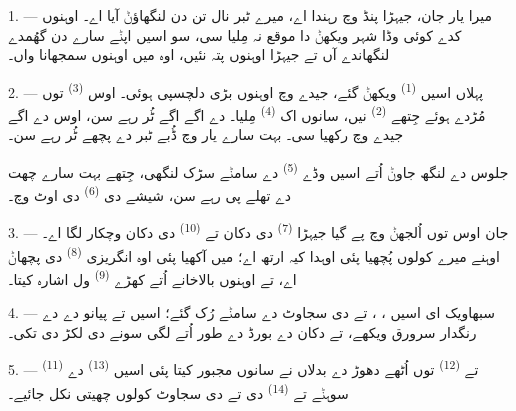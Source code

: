 
\VUsaut{4.0mm}
\VUsaut{3.0mm}

\VUsaut{3.0mm}

1. --- میرا یار جان، جیہڑا پنڈ وچ رہندا اے، میرے ٹبر نال تن دن لنگھاؤݨ آیا اے۔
 اوہنوں کدے کوئی وڈا شہر ویکھݨ دا موقع نہ مِلیا سی، سو اسیں اپݨے
سارے دن گھُمدے لنگھاندے آں تے جیہڑا اوہنوں پتہ نئیں، اوہ میں اوہنوں سمجھانا واں۔

2. --- پہلاں اسیں  \textsuperscript{(1)} ویکھݨ گئے، جیدے وچ اوہنوں
بڑی دلچسپی ہوئی۔ اوس  \textsuperscript{(3)} توں مُڑدے ہوئے جِتھے
 \textsuperscript{(2)} نیں، سانوں اک 
\textsuperscript{(4)} مِلیا۔  دے اگے اگے  ٹُر
رہے سن، اوس  دے اگے جیدے وچ  رکھیا سی۔ بہت سارے
یار  وچ ڈُبے ٹبر دے پچھے ٹُر رہے سن۔

جلوس دے لنگھ جاوݨ اُتے اسیں وڈے  \textsuperscript{(5)} دے سامݨے
سڑک لنگھی، جِتھے بہت سارے  چھت دے تھلے  پی رہے سن، شیشے
دی  \textsuperscript{(6)} دی اوٹ وچ۔

3. --- جان اوس  توں اُلجھݨ وچ پے گیا جیہڑا  \textsuperscript{(7)} دی دکان تے  \textsuperscript{(10)}
دی دکان وچکار لگا اے۔ اوہنے میرے کولوں پُچھیا پئی اوہدا کیہ ارتھ اے؛ میں آکھیا پئی
اوہ انگریزی  \textsuperscript{(8)} دی پچھاݨ اے، تے اوہنوں
بالاخانے اُتے کھڑے  \textsuperscript{(9)} ول اشارہ کیتا۔

\VUsaut{3.0mm}

4. --- سبھاویک ای اسیں ، ،  تے
 دی سجاوٹ دے سامݨے رُک گئے؛ اسیں  تے پیانو دے
 دے رنگدار سرورق ویکھے، تے دکان دے بورڈ دے طور اُتے لگی سونے دی لکڑ
دی  تکی۔

5. ---  \textsuperscript{(11)} تے 
\textsuperscript{(12)} توں اُٹھے دھوڑ دے بدلاں نے سانوں مجبور کیتا پئی اسیں
 \textsuperscript{(13)} دے سوہݨے  تے
 \textsuperscript{(14)} دی  تے
 دی سجاوٹ کولوں چھیتی نکل جائیے۔

